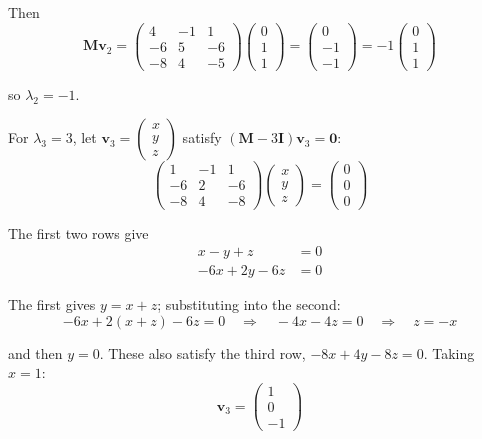 \documentclass[leqno]{article}
\begin{document}
\begin{enumerate}[
  label=\textbf{\arabic*.},
  leftmargin=*,
  topsep=0pt,
  partopsep=0pt,
  parsep=0pt
]
\begin{djsSolution}
\begin{enumerate}[label=\textbf{(\alph*)}, start=1]
Then
\[
\mathbf{M}\mathbf{v}_2=\begin{pmatrix} 4 & -1 & 1 \\ -6 & 5 & -6 \\ -8 & 4 & -5 \end{pmatrix}\begin{pmatrix} 0 \\ 1 \\ 1 \end{pmatrix}=\begin{pmatrix} 0 \\ -1 \\ -1 \end{pmatrix}=-1\begin{pmatrix} 0 \\ 1 \\ 1 \end{pmatrix}
\]

so \(\lambda_2=-1\).

For \(\lambda_3=3\), let \(\mathbf{v}_3=\begin{pmatrix} x \\ y \\ z \end{pmatrix}\) satisfy \((\mathbf{M}-3\mathbf{I})\mathbf{v}_3=\mathbf{0}\):
\[
\begin{pmatrix} 1 & -1 & 1 \\ -6 & 2 & -6 \\ -8 & 4 & -8 \end{pmatrix}\begin{pmatrix} x \\ y \\ z \end{pmatrix}=\begin{pmatrix} 0 \\ 0 \\ 0 \end{pmatrix}
\]

The first two rows give
\begin{align*}
x-y+z&=0\\
-6x+2y-6z&=0
\end{align*}

The first gives \(y=x+z\); substituting into the second:
\[
-6x+2(x+z)-6z=0 \quad\Longrightarrow\quad -4x-4z=0 \quad\Longrightarrow\quad z=-x
\]

and then \(y=0\). These also satisfy the third row, \(-8x+4y-8z=0\). Taking \(x=1\):
\[
\mathbf{v}_3=\begin{pmatrix} 1 \\ 0 \\ -1 \end{pmatrix}
\]


\end{enumerate}
\end{djsSolution}
\end{enumerate}
\end{document}
